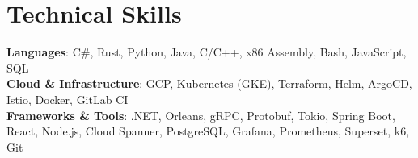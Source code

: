 \documentclass[letterpaper,11pt]{article}
\begin{document}
\section{Technical Skills}
 \begin{itemize}[leftmargin=0.15in, label={}]
    \small{\item{
     \textbf{Languages}{: C\#, Rust, Python, Java, C/C++, x86 Assembly, Bash, JavaScript, SQL} \\
     \textbf{Cloud \& Infrastructure}{: GCP, Kubernetes (GKE), Terraform, Helm, ArgoCD, Istio, Docker, GitLab CI} \\
     \textbf{Frameworks \& Tools}{: .NET, Orleans, gRPC, Protobuf, Tokio, Spring Boot, React, Node.js, Cloud Spanner, PostgreSQL, Grafana, Prometheus, Superset, k6, Git} \\
    }}
 \end{itemize}


\end{document}
